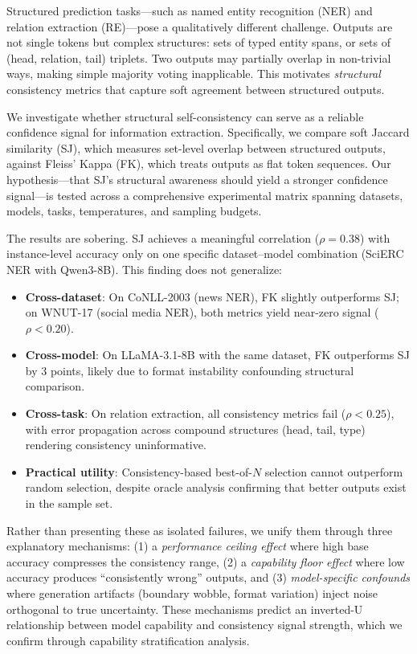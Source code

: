\documentclass[11pt,a4paper]{article}
\begin{document}
Structured prediction tasks---such as named entity recognition (NER) and relation extraction (RE)---pose a qualitatively different challenge.
Outputs are not single tokens but complex structures: sets of typed entity spans, or sets of (head, relation, tail) triplets.
Two outputs may partially overlap in non-trivial ways, making simple majority voting inapplicable.
This motivates \emph{structural} consistency metrics that capture soft agreement between structured outputs.

We investigate whether structural self-consistency can serve as a reliable confidence signal for information extraction.
Specifically, we compare soft Jaccard similarity (SJ), which measures set-level overlap between structured outputs, against Fleiss' Kappa (FK), which treats outputs as flat token sequences.
Our hypothesis---that SJ's structural awareness should yield a stronger confidence signal---is tested across a comprehensive experimental matrix spanning datasets, models, tasks, temperatures, and sampling budgets.

The results are sobering.
SJ achieves a meaningful correlation ($\rho{=}0.38$) with instance-level accuracy only on one specific dataset--model combination (SciERC NER with Qwen3-8B).
This finding does not generalize:
\begin{itemize}
\item \textbf{Cross-dataset}: On CoNLL-2003 (news NER), FK slightly outperforms SJ; on WNUT-17 (social media NER), both metrics yield near-zero signal ($\rho < 0.20$).
\item \textbf{Cross-model}: On LLaMA-3.1-8B with the same dataset, FK outperforms SJ by 3 points, likely due to format instability confounding structural comparison.
\item \textbf{Cross-task}: On relation extraction, all consistency metrics fail ($\rho < 0.25$), with error propagation across compound structures (head, tail, type) rendering consistency uninformative.
\item \textbf{Practical utility}: Consistency-based best-of-$N$ selection cannot outperform random selection, despite oracle analysis confirming that better outputs exist in the sample set.
\end{itemize}

Rather than presenting these as isolated failures, we unify them through three explanatory mechanisms: (1) a \emph{performance ceiling effect} where high base accuracy compresses the consistency range, (2) a \emph{capability floor effect} where low accuracy produces ``consistently wrong'' outputs, and (3) \emph{model-specific confounds} where generation artifacts (boundary wobble, format variation) inject noise orthogonal to true uncertainty.
These mechanisms predict an inverted-U relationship between model capability and consistency signal strength, which we confirm through capability stratification analysis.
\end{document}
